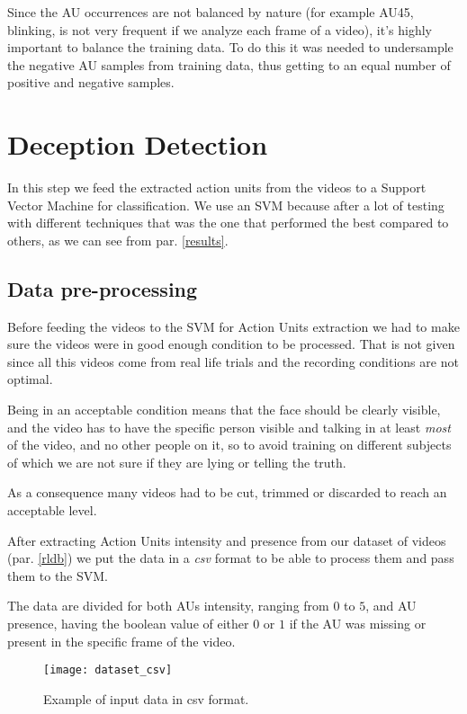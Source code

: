 Since the AU occurrences are not balanced by nature (for example AU45, blinking, is not very frequent if we analyze each frame of a video), it's highly important to balance the training data. To do this it was needed to undersample the negative AU samples from training data, thus getting to an equal number of positive and negative samples.

\clearpage

\section{Deception Detection} \label{dec_det}
In this step we feed the extracted action units from the videos to a Support Vector Machine for classification.
We use an SVM because after a lot of testing with different techniques that was the one that performed the best compared to others, as we can see from par. \ref{results}. 

\subsection{Data pre-processing}
Before feeding the videos to the SVM for Action Units extraction we had to make sure the videos were in good enough condition to be processed. That is not given since all this videos come from real life trials and the recording conditions are not optimal.

Being in an acceptable condition means that the face should be clearly visible, and the video has to have the specific person visible and talking in at least \textit{most} of the video, and no other people on it, so to avoid training on different subjects of which we are not sure if they are lying or telling the truth.

As a consequence many videos had to be cut, trimmed or discarded to reach an acceptable level.

After extracting Action Units intensity and presence from our dataset of videos (par. \ref{rldb}) we put the data in a \textit{csv} format to be able to process them and pass them to the SVM. 

The data are divided for both AUs intensity, ranging from $0$ to $5$, and AU presence, having the boolean value of either $0$ or $1$ if the AU was missing or present in the specific frame of the video.

\begin{figure}[H]
	\centering
	\texttt{[image: dataset\_csv]}
	\caption{Example of input data in csv format.}
	\label{fig:dataset_csv}
\end{figure}


